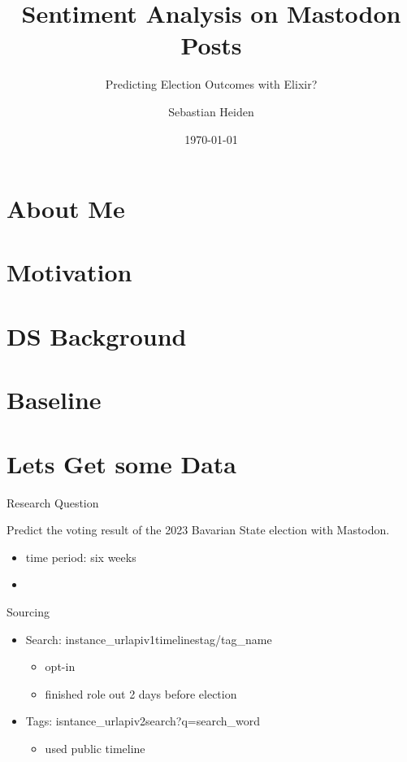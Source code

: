 \documentclass[usenames,dvipsnames,aspectratio=169]{beamer}
\title{Sentiment Analysis on Mastodon Posts}
\subtitle{Predicting Election Outcomes with Elixir?}
\author{Sebastian Heiden}
\institute{Harz University of Applied Sciences}
\date{\today}
\begin{document}
	
	{
		\begin{frame}
			\titlepage
		\end{frame}
	}
	
	
	\section{About Me}
	
	
	\section{Motivation}
	
	
	\section{DS Background}
	
	
	\section{Baseline}
	
	
	
	\section{Lets Get some Data}
	\begin{frame}{Research Question}
		
		Predict the voting result of the 2023 Bavarian State election with Mastodon.
		
		\begin{itemize}
			\item time period: six weeks
			\item  
		\end{itemize}
		
	\end{frame}
	
	\begin{frame}{Sourcing}
		
		\begin{itemize}
			\item Search: {{instance\_url}}\/api\/v1\/timelines\/tag/{{tag\_name}}
			\begin{itemize}
				\item opt-in
				\item finished role out 2 days before election
			\end{itemize}
			\item Tags: {{isntance\_url}}\/api\/v2\/search?q={{search\_word}}
			\begin{itemize}
				\item used public timeline
			\end{itemize}
			
		\end{itemize}
	\end{frame}
	
\end{document}
